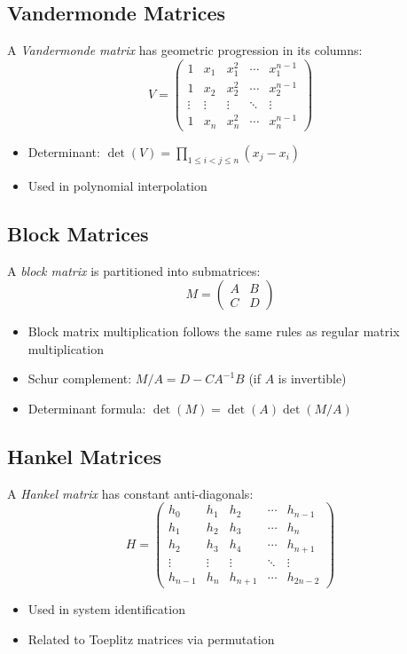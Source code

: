 \subsection{Vandermonde Matrices}
A \emph{Vandermonde matrix} has geometric progression in its columns:
\[
V = \begin{pmatrix}
1 & x_1 & x_1^2 & \cdots & x_1^{n-1} \\
1 & x_2 & x_2^2 & \cdots & x_2^{n-1} \\
\vdots & \vdots & \vdots & \ddots & \vdots \\
1 & x_n & x_n^2 & \cdots & x_n^{n-1}
\end{pmatrix}
\]
\begin{itemize}
    \item Determinant: $\det(V) = \prod_{1 \le i < j \le n} (x_j - x_i)$
    \item Used in polynomial interpolation
\end{itemize}

\subsection{Block Matrices}
A \emph{block matrix} is partitioned into submatrices:
\[
M = \begin{pmatrix}
A & B \\
C & D
\end{pmatrix}
\]
\begin{itemize}
    \item Block matrix multiplication follows the same rules as regular matrix multiplication
    \item Schur complement: $M/A = D - CA^{-1}B$ (if $A$ is invertible)
    \item Determinant formula: $\det(M) = \det(A)\det(M/A)$
\end{itemize}

\subsection{Hankel Matrices}
A \emph{Hankel matrix} has constant anti-diagonals:
\[
H = \begin{pmatrix}
h_0 & h_1 & h_2 & \cdots & h_{n-1} \\
h_1 & h_2 & h_3 & \cdots & h_n \\
h_2 & h_3 & h_4 & \cdots & h_{n+1} \\
\vdots & \vdots & \vdots & \ddots & \vdots \\
h_{n-1} & h_n & h_{n+1} & \cdots & h_{2n-2}
\end{pmatrix}
\]
\begin{itemize}
    \item Used in system identification
    \item Related to Toeplitz matrices via permutation
\end{itemize}

